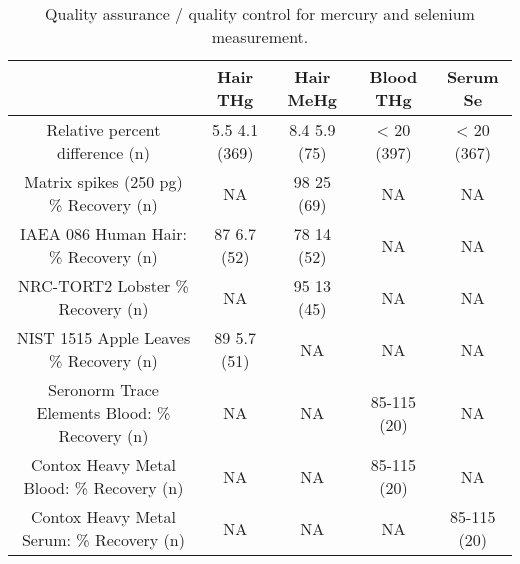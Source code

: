\begin{table}[htp]
\tiny
\caption[Quality assurance / quality control for mercury and selenium measurement]{Quality assurance / quality control for mercury and selenium measurement.}
\begin{center}
\begin{tabular}{|c|c|c|c|c|}
\hline
 & Hair THg & Hair MeHg & Blood THg & Serum Se  \\ \hline
Relative percent difference (n) & 5.5  4.1 (369) & 8.4  5.9 (75) & < 20 (397) & < 20 (367)  \\ \hline
Matrix spikes (250 pg) 
\% Recovery (n) & NA & 98  25 (69) & NA & NA  \\ \hline
IAEA 086 Human Hair: 
\% Recovery (n) & 87  6.7 (52) & 78  14 (52) & NA & NA  \\ \hline
NRC-TORT2 Lobster 
\% Recovery (n) & NA & 95  13 (45) & NA & NA  \\ \hline
NIST 1515 Apple Leaves 
\% Recovery (n) & 89  5.7  (51) & NA & NA & NA  \\ \hline
Seronorm Trace Elements Blood: \% Recovery (n) & NA & NA & 85-115 (20) & NA  \\ \hline
Contox Heavy Metal 
Blood: \% Recovery (n) & NA & NA & 85-115 (20) & NA  \\ \hline
Contox Heavy Metal 
Serum: \% Recovery (n) & NA & NA & NA & 85-115 (20)  \\ \hline
\end{tabular}
\end{center}
\label{default}
\end{table}